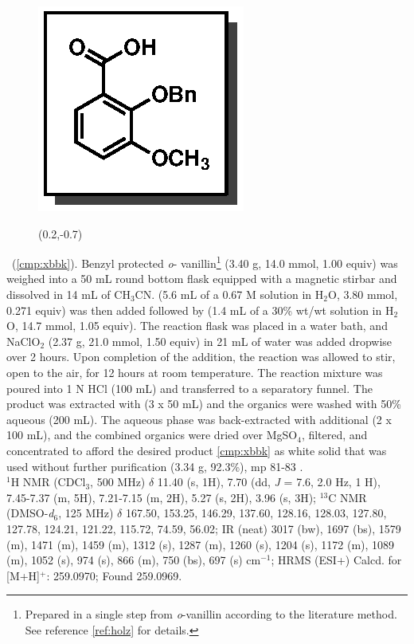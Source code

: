 \vspace{10pt}
\begin{figure}
  \vspace{-25pt}
  \begin{center}
    \includegraphics[scale=0.8]{chp_singlecarbon/images/xbbk}
    \begin{textblock}{1}(0.2,-0.7)  \end{textblock}
  \end{center}
  \vspace{-30pt}
\end{figure}\noindent \textbf{\CMPxbbk}\ (\ref{cmp:xbbk}). Benzyl protected \textit{o}-
vanillin\footnote{Prepared in a single step from \textit{o}-vanillin according to the literature
method. See reference \ref{ref:holz} for details.} (3.40 g, 14.0 mmol, 1.00 equiv) was weighed into
a 50 mL round bottom flask equipped with a magnetic stirbar and dissolved in 14 mL of CH$_3$CN.
 (5.6 mL of a 0.67 M solution in H$_2$O, 3.80 mmol, 0.271 equiv) was then added followed
by  (1.4 mL of a 30\% wt/wt solution in H$_2$O, 14.7 mmol,
1.05 equiv). The reaction flask was placed in a water bath, and NaClO$_2$ (2.37 g, 21.0 mmol, 1.50
equiv) in 21 mL of water was added dropwise over 2 hours. Upon completion of the addition, the
reaction was allowed to stir, open to the air, for 12 hours at room temperature. The reaction
mixture was poured into 1 N HCl (100 mL) and transferred to a separatory funnel. The product
was extracted with  (3 x 50 mL) and the organics were washed with 50\% aqueous
 (200 mL). The aqueous phase was back-extracted with additional  (2 x 100
mL), and the combined organics were dried over MgSO$_4$, filtered, and concentrated to afford the
desired product \ref{cmp:xbbk} as white solid that was used without further purification (3.34 g,
92.3\%), mp 81-83 \degc.\\
$^1$H NMR (CDCl$_3$, 500 MHz) $\delta$ 11.40 (s, 1H), 7.70 (dd, \textit{J} = 7.6, 2.0 Hz, 1 H), 7.45-7.37 (m, 5H),
7.21-7.15 (m, 2H), 5.27 (s, 2H), 3.96 (s, 3H); $^{13}$C NMR (DMSO-\textit{d}$_6$, 125 MHz) $\delta$ 167.50, 153.25,
146.29, 137.60, 128.16, 128.03, 127.80, 127.78, 124.21, 121.22, 115.72, 74.59, 56.02; IR (neat)
3017 (bw), 1697 (bs), 1579 (m), 1471 (m), 1459 (m), 1312 (s), 1287 (m), 1260 (s), 1204 (s), 1172
(m), 1089 (m), 1052 (s), 974 (s), 866 (m), 750 (bs), 697 (s) cm$^{-1}$; HRMS (ESI+) Calcd. for
 [M+H]$^+$: 259.0970; Found 259.0969.

